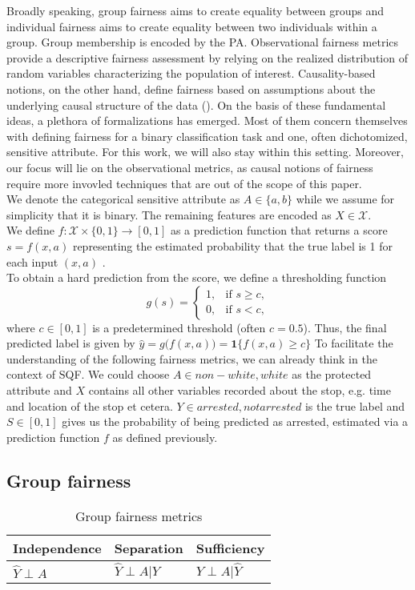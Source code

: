 Broadly speaking, group fairness aims to create equality between groups and individual fairness aims to create equality between two individuals within a group. Group membership is encoded by the PA. Observational fairness metrics provide a descriptive fairness assessment by relying on the realized distribution of random variables characterizing the population of interest. Causality-based notions, on the other hand, define fairness based on assumptions about the underlying causal structure of the data (\cite{castelnovo2022}).
On the basis of these fundamental ideas, a plethora of formalizations has emerged. Most of them concern themselves with defining fairness for a binary classification task and one, often dichotomized, sensitive attribute. For this work, we will also stay within this setting. Moreover, our focus will lie on the observational metrics, as causal notions of fairness require more invovled techniques that are out of the scope of this paper.\\
We denote the categorical sensitive attribute as $A \in \{a,b\}$ while we assume for simplicity that it is binary. The remaining features are encoded as $X \in \mathcal{X}$.\\
We define $f : \mathcal{X} \times \{0,1\} \to [0,1]$ as a prediction function that returns a score \(s = f(x, a)\) representing the estimated probability that the true label is 1 for each input $(x, a)$ .\\
To obtain a hard prediction from the score, we define a thresholding function
$$ g(s) = \begin{cases} 
1, & \text{if } s \ge c, \\
0, & \text{if } s < c,
\end{cases}$$
where \(c \in [0,1]\) is a predetermined threshold (often \(c = 0.5\)).
Thus, the final predicted label is given by $\hat{y} = g\bigl(f(x, a)\bigr) = \mathbf{1}\{f(x, a) \ge c\}$
To facilitate the understanding of the following fairness metrics, we can already think in the context of SQF. We could choose $A \in {non-white, white}$ as the protected attribute and $X$ contains all other variables recorded about the stop, e.g. time and location of the stop et cetera. $Y \in {arrested, not arrested}$ is the true label and $S \in [0,1]$ gives us the probability of being predicted as arrested, estimated via a prediction function $f$ as defined previously. 
\subsection{Group fairness}
\begin{table}
    \centering
    \begin{tabular}{lll}
        \toprule
        Independence & Separation & {Sufficiency} \\
        \midrule
        $\hat{Y} \perp A$ & $\hat{Y} \perp A | Y$ & {$Y \perp A | \hat{Y}$}\\
        \bottomrule
    \end{tabular}
    \caption{Group fairness metrics}
    \label{tab:group_fairness}
\end{table}

